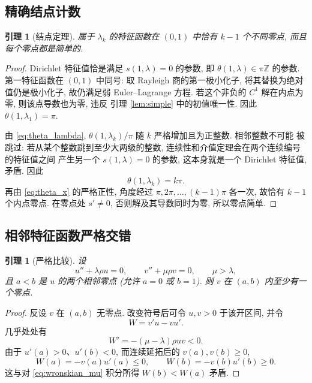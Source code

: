 \documentclass[UTF8]{ctexart}
\newtheorem{lemma}[theorem]{引理}
\begin{document}
\subsection{精确结点计数}

\begin{lemma}[结点定理]\label{lem:nodal}
属于 $\lambda_k$ 的特征函数在 $(0,1)$ 中恰有 $k-1$ 个不同零点, 而且每个零点都是简单的.
\end{lemma}

\begin{proof}
Dirichlet 特征值恰是满足 $s(1,\lambda)=0$ 的参数, 即 $\theta(1,\lambda)\in\pi\mathbb Z$ 的参数.
第一特征函数在 $(0,1)$ 中同号: 取 Rayleigh 商的第一极小化子, 将其替换为绝对值仍是极小化子,
故仍满足弱 Euler--Lagrange 方程. 若这个非负的 $C^1$ 解在内点为零, 则该点导数也为零, 违反
引理 \ref{lem:simple} 中的初值唯一性. 因此 $\theta(1,\lambda_1)=\pi$.

由 \eqref{eq:theta_lambda}, $\theta(1,\lambda_k)/\pi$ 随 $k$ 严格增加且为正整数. 相邻整数不可能
被跳过: 若从某个整数跳到至少大两级的整数, 连续性和介值定理会在两个连续编号的特征值之间
产生另一个 $s(1,\lambda)=0$ 的参数, 这本身就是一个 Dirichlet 特征值, 矛盾. 因此
\begin{equation*}
	\theta(1,\lambda_k)=k\pi .
\end{equation*}
再由 \eqref{eq:theta_x} 的严格正性, 角度经过 $\pi,2\pi,\dots,(k-1)\pi$ 各一次, 故恰有
$k-1$ 个内点零点. 在零点处 $s'\ne0$, 否则解及其导数同时为零, 所以零点简单.
\end{proof}

\subsection{相邻特征函数严格交错}

\begin{lemma}[严格比较]\label{lem:compare}
设
\begin{equation*}
	u''+\lambda\rho u=0,\qquad v''+\mu\rho v=0,\qquad \mu>\lambda,
\end{equation*}
且 $a<b$ 是 $u$ 的两个相邻零点 (允许 $a=0$ 或 $b=1$). 则 $v$ 在 $(a,b)$ 内至少有一个零点.
\end{lemma}

\begin{proof}
反设 $v$ 在 $(a,b)$ 无零点. 改变符号后可令 $u,v>0$ 于该开区间, 并令
\begin{equation*}
	W=v'u-vu'.
\end{equation*}
几乎处处有
\begin{equation}
	W'=-(\mu-\lambda)\rho uv<0 .
	\label{eq:wronskian_mu}
\end{equation}
由于 $u'(a)>0$、$u'(b)<0$, 而连续延拓后的 $v(a),v(b)\ge0$,
\begin{equation*}
	W(a)=-v(a)u'(a)\le0,\qquad W(b)=-v(b)u'(b)\ge0 .
\end{equation*}
这与对 \eqref{eq:wronskian_mu} 积分所得 $W(b)<W(a)$ 矛盾.
\end{proof}
\end{document}
